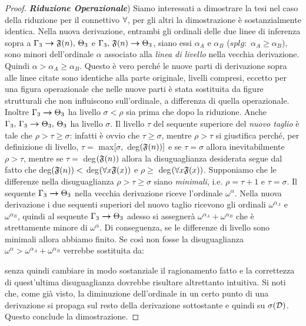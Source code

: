 \begin{proof}
		\emph{\textbf{Riduzione Operazionale}}) Siamo interessati a dimostrare la tesi nel caso della riduzione per il connettivo $\forall$, per gli altri la dimostrazione è sostanzialmente identica.
		Nella nuova derivazione, entrambi gli ordinali delle due linee di inferenza sopra a $\Gamma_3 \bm{\rightarrow} \mathfrak{F}(n),\,\Theta_3$ e $\Gamma_3,\,\mathfrak{F}(n) \bm{\rightarrow} \Theta_3$, siano essi $\alpha_A$ e $\alpha_B$ ($splg:$ $\alpha_A \ge \alpha_B$), sono minori dell'ordinale $\alpha$ associato alla \emph{linea di livello} nella vecchia derivazione. Quindi $\alpha>\alpha_A\ge\alpha_B$. Questo è vero perché le nuove parti di derivazione sopra alle linee citate sono identiche alla parte originale, livelli compresi, eccetto per una figura operazionale che nelle nuove parti è stata sostituita da figure strutturali che non influiscono sull'ordinale, a differenza di quella operazionale. Inoltre $\Gamma_3 \bm{\rightarrow} \Theta_3$ ha livello $\sigma<\rho$ sia prima che dopo la riduzione. Anche $\Gamma_3,\,\Gamma_3 \bm{\rightarrow} \Theta_3,\,\Theta_3$ ha livello $\sigma$. Il livello $\tau$ del sequente superiore del \emph{nuovo taglio} è tale che $\rho>\tau \ge \sigma$: infatti è ovvio che $\tau \ge \sigma$, mentre $\rho>\tau$ si giustifica perché, per definizione di livello, $\tau=$ max$[\sigma,$ deg$(\mathfrak{F}(n))]$ e se $\tau=\sigma$ allora inevitabilmente $\rho>\tau$, mentre se $\tau=$ deg$(\mathfrak{F}(n))$ allora la disuguaglianza desiderata segue dal fatto che deg$(\mathfrak{F}(n))<$ deg$(\forall x\mathfrak{F}(x))$ e $\rho\ge$ deg$(\forall x\mathfrak{F}(x))$.
		Supponiamo che le differenze nella disuguaglianza $\rho>\tau \ge \sigma$ siano \emph{minimali}, i.e. $\rho=\tau+1$ e $\tau=\sigma$. Il sequente $\Gamma_3 \bm{\rightarrow} \Theta_3$ nella vecchia derivazione riceve l'ordinale $\omega^\alpha$. Nella nuova derivazione i due sequenti superiori del nuovo taglio ricevono gli ordinali $\omega^{\alpha_A}$ e $\omega^{\alpha_B}$, quindi al sequente $\Gamma_3 \bm{\rightarrow} \Theta_3$ adesso si assegnerà $\omega^{\alpha_A}+\omega^{\alpha_B}$ che è strettamente minore di $\omega^\alpha$. Di conseguenza, se le differenze di livello sono minimali allora abbiamo finito. Se così non fosse la disuguaglianza $\omega^\alpha>\omega^{\alpha_A}+\omega^{\alpha_B}$ verrebbe sostituita da:
		
		senza quindi cambiare in modo sostanziale il ragionamento fatto e la correttezza di quest'ultima disuguaglianza dovrebbe risultare altrettanto intuitiva.
		Si noti che, come già visto, la diminuzione dell'ordinale in un certo punto di una derivazione si propaga sul resto della derivazione sottostante e quindi su $\sigma(\mathcal{D})$. Questo conclude la dimostrazione.
	\end{proof}
